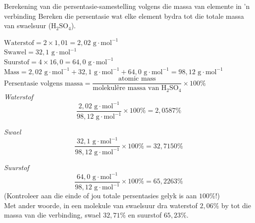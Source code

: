       \begin{wex}{Berekening van die persentasie-samestelling volgens die  massa van elemente in 'n verbinding}
{
Bereken die persentasie wat elke element bydra tot die totale massa van swaelsuur (${\text{H}}_{2}{\text{SO}}_{4}$).
      }
{
$\text{Waterstof}=2 \times 1,01 = 2,02 \text{ g} \cdot \text{mol}^{-1}$ \\ 
$\text{Swawel}=32,1 \text{ g} \cdot \text{mol}^{-1}$ \\
$\text{Suurstof}=4 \times 16,0 = 64,0 \text{ g} \cdot \text{mol}^{-1}$
$\text{Mass}=2,02 \text{ g} \cdot \text{mol}^{-1} + 32,1 \text{ g} \cdot \text{mol}^{-1} + 64,0 \text{ g} \cdot \text{mol}^{-1} = 98,12 \text{ g} \cdot \text{mol}^{-1}$
      \label{m38712*id280688}$\text{Persentasie volgens massa}=\dfrac{\text{atomic mass}}{\text{molekul\^{e}re massa van H}{}_{2}\text{SO}{}_{4}} \times 100\%$ \\

        \textsl{Waterstof}      
      \label{m38712*id280735}\nopagebreak\noindent{}        
    \begin{equation*}
    \frac{2,02 \text{ g} \cdot \text{mol}^{-1}}{98,12 \text{ g} \cdot \text{mol}^{-1}}\ensuremath{\times}100\%=2,0587\%
      \end{equation*}

        \textsl{Swael}      
      \label{m38712*id280786}\nopagebreak\noindent{}        
    \begin{equation*}
    \frac{32,1 \text{ g} \cdot \text{mol}^{-1}}{98,12 \text{ g} \cdot \text{mol}^{-1}}\ensuremath{\times}100\%=32,7150\%
      \end{equation*}

        \textsl{Suurstof}     
      \label{m38712*id280837}\nopagebreak\noindent{}
    \begin{equation*}
    \frac{64,0 \text{ g} \cdot \text{mol}^{-1}}{98,12 \text{ g} \cdot \text{mol}^{-1}}\ensuremath{\times}100\%=65,2263\%
      \end{equation*}
      \label{m38712*id280876}(Kontroleer aan die einde of jou totale persentasies gelyk is aan $100\%$!) \\
      \label{m38712*id280880}Met ander woorde, in een molekule van swaelsuur dra waterstof $2,06\%$ by tot die massa van die verbinding, swael $32,71\%$ en suurstof $65,23\%$. 
}
    \end{wex}
